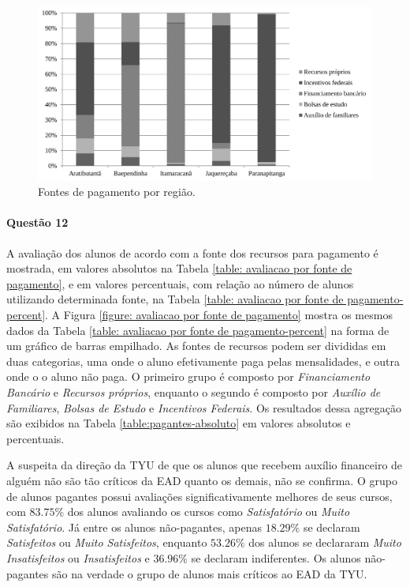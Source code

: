 \documentclass[10pt,a4paper,oneside]{article}
\begin{document}
\begin{figure}
\centering
	\includegraphics[width=0.80\linewidth]{plots/q11}
	\caption{Fontes de pagamento por região.}
	\label{figure: fonte de pagemento}
\end{figure}

\FloatBarrier
\paragraph{Questão 12}

A avaliação dos alunos de acordo com a fonte dos recursos para pagamento é mostrada, em valores absolutos na Tabela \ref{table: avaliacao por fonte de pagamento}, e em valores percentuais, com relação ao número de alunos utilizando determinada fonte, na Tabela \ref{table: avaliacao por fonte de pagamento-percent}. A Figura \ref{figure: avaliacao por fonte de pagamento} mostra os mesmos dados da Tabela \ref{table: avaliacao por fonte de pagamento-percent} na forma de um gráfico de barras empilhado. As fontes de recursos podem ser divididas em duas categorias, uma onde o aluno efetivamente paga pelas mensalidades, e outra onde o o aluno não paga. O primeiro grupo é composto por \textit{Financiamento Bancário} e \textit{Recursos próprios}, enquanto o segundo é composto por \textit{Auxílio de Familiares}, \textit{Bolsas de Estudo} e \textit{Incentivos Federais}. Os resultados dessa agregação são exibidos na Tabela \ref{table:pagantes-absoluto} em valores absolutos e percentuais.

A suspeita da direção da TYU de que os alunos que recebem auxílio financeiro de alguém não são tão críticos da EAD quanto os demais, não se confirma. O grupo de alunos pagantes possui avaliações significativamente melhores de seus cursos, com $83.75\%$ dos alunos avaliando os cursos como \textit{Satisfatório} ou \textit{Muito Satisfatório}. Já entre os alunos não-pagantes, apenas $18.29\%$ se declaram \textit{Satisfeitos} ou \textit{Muito Satisfeitos}, enquanto $53.26\%$ dos alunos se declararam \textit{Muito Insatisfeitos} ou \textit{Insatisfeitos} e $36.96\%$ se declaram indiferentes. Os alunos não-pagantes são na verdade o grupo de alunos mais críticos ao EAD da TYU.
\end{document}
